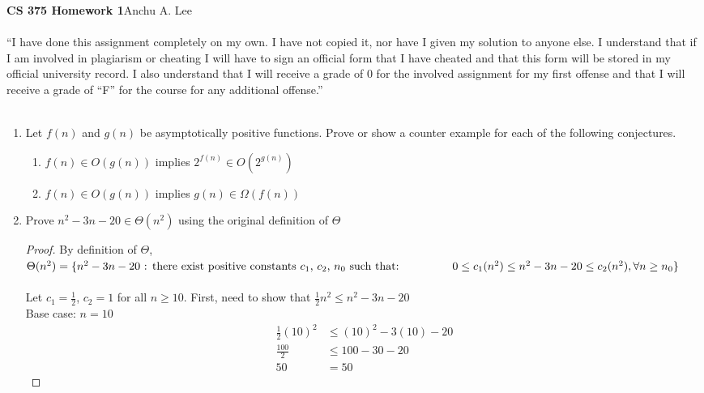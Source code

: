 \documentclass{article}
\begin{document}
        \noindent\textbf{CS 375 Homework 1}\hfill Anchu A. Lee
        \\\\“I have done this assignment completely on my own. I have not copied it, nor have I given my solution to anyone else. I understand that if I am involved in plagiarism or cheating I will have to sign an official form that I have cheated and that this form will be stored in my official university record. I also understand that I will receive a grade of 0 for the involved assignment for my first offense and that I will receive a grade of “F” for the course for any additional offense.” 
        \\\\
        \begin{enumerate}
            \item Let $f(n)$ and $g(n)$ be asymptotically positive functions. Prove or show a counter example for each of the following conjectures.
                \begin{enumerate}
                    \item $f(n)\in O(g(n))$ implies $2^{f(n)}\in O(2^{g(n)})$
                    \item $f(n)\in O(g(n))$ implies $g(n)\in\Omega(f(n))$
                \end{enumerate}
            \item Prove $n^2-3n-20\in\Theta(n^2)$ using the original definition of $\Theta$
                \begin{proof}
                    By definition of $\Theta$, \\$\Theta(n^2) = \{n^2-3n-20 \text{ : there exist positive constants } c_1 \text{, } c_2 \text{, } n_0 \text{ such that: }\\ 
                        \text{\hspace{1.5cm}}0\leq c_1(n^2)\leq n^2-3n-20\leq c_2(n^2), \forall n\geq n_0\}$
                    \\\\
                    Let $c_1 = \frac{1}{2}$, $c_2 = 1$ for all $n \geq 10$.
                    First, need to show that $\frac{1}{2}n^2\leq n^2-3n-20$\\
                    Base case: $n=10$
                    \begin{align*}
                        \frac{1}{2}(10)^2 &\leq (10)^2-3(10)-20\\
                        \frac{100}{2} &\leq 100-30-20\\
                        50 &= 50

\end{align*}
\end{proof}
\end{enumerate}
\end{document}
